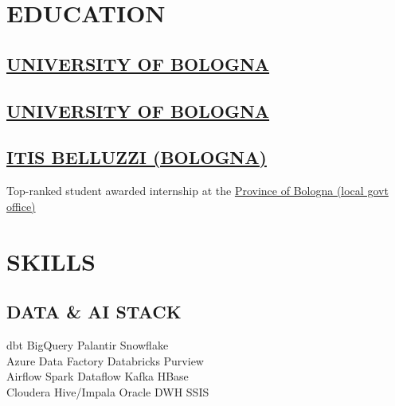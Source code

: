 \documentclass[]{deedy-resume-cv}
\begin{document}
\hfill
\begin{minipage}[t]{0.35\textwidth}

\section{EDUCATION}

\subsection{\href{https://www.unibo.it/}{UNIVERSITY OF BOLOGNA}}

\sectionsep
\subsection{\href{https://www.unibo.it/}{UNIVERSITY OF BOLOGNA}}

\sectionsep
\subsection{\href{https://www.belluzzifioravanti.it/}{ITIS BELLUZZI (BOLOGNA)}}
Top-ranked student awarded internship at the \href{https://www.cittametropolitana.bo.it/}{Province of Bologna (local govt office)}

\section{SKILLS}

\subsection{DATA \& AI STACK}
dbt \textbullet{} BigQuery \textbullet{} Palantir \textbullet{} Snowflake \\
Azure Data Factory \textbullet{} Databricks \textbullet{} Purview \\
Airflow \textbullet{} Spark \textbullet{} Dataflow \textbullet{} Kafka \textbullet{} HBase \\
Cloudera Hive/Impala \textbullet{} Oracle DWH \textbullet{} SSIS


\end{minipage}
\end{document}
